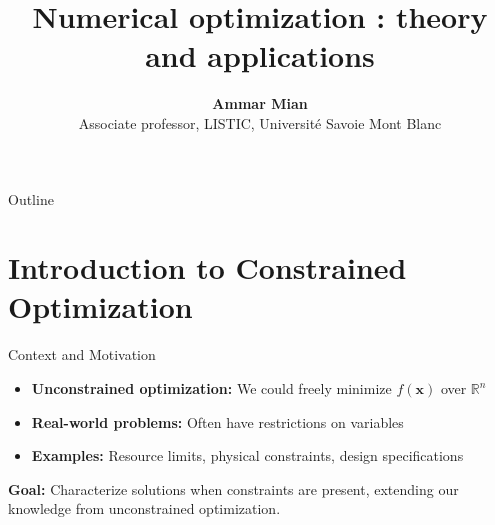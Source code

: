 \documentclass[aspectratio=1610]{beamer}
\title[Numerical optimization]{Numerical optimization : theory and applications}
\date[]{}
\author[AM]{\textbf{Ammar Mian} \\ \footnotesize Associate professor, LISTIC, Université Savoie Mont Blanc}
\begin{document}


  
\begin{frame}
\titlepage
\end{frame}
\begingroup
{}
\begin{frame}{Outline}
    \tableofcontents[]
\end{frame}

\endgroup






\section{Introduction to Constrained Optimization}
\begin{frame}{Context and Motivation}
  \begin{itemize}
    \item \textbf{Unconstrained optimization:} We could freely minimize $f(\mathbf{x})$ over $\mathbb{R}^n$
    \item \textbf{Real-world problems:} Often have restrictions on variables
    \item \textbf{Examples:} Resource limits, physical constraints, design specifications
  \end{itemize}
  \vspace{0.5cm}
  \textbf{Goal:} Characterize solutions when constraints are present, extending our knowledge from unconstrained optimization.
\end{frame}
\end{document}
